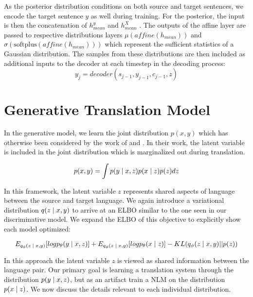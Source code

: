 As the  posterior distribution conditions on both source and target sentences, we encode the target sentence $y$ as well during training. For the posterior, the input is then the concatenation of $h_{mean}^y$ and $h_{mean}^X$ . The outputs of the affine layer are passed to respective distributions layers $\mu(affine(h_{mean}))$ and $\sigma(\text{softplus} (affine(h_{mean})))$ which represent the sufficient statistics of a Gaussian distribution. The samples from these distributions are then included as additional inputs to the decoder at each timestep in the decoding process:
\begin{equation}
y_{j} = decoder(s_{j-1}, y_{j-1}, c_{j-1}, z)
\end{equation}



\section{Generative Translation Model}

In the generative model, we learn the joint distribution $p(x, y)$ which has otherwise been considered by the work of \citet{eikema2018AEVNMT} and \citet{harshil2018GNMT}. In their work, the latent variable is included in the joint distribution which is marginalized out during translation.

\begin{equation}
	p(x, y) = \int p(y \; | \;{x, z})  p(x\; | \;{z}) p(z) dz
\end{equation}

In this framework, the latent variable $z$ represents shared aspects of language between the source and target language. We again introduce a variational distribution $q( z\; | \;{x, y})$ to arrive at an ELBO similar to the one seen in our discriminative model. We expand the \ac{ELBO} of this objective to explicitly show each model optimized:

\begin{equation}
E_{q_{\phi}(z \; | \;{x,y})} [ log p_{\theta}(y \; | \;{x, z})] +
E_{q_{\phi}(z \; | \;{x,y})} [ log p_{\theta}(x \; | \;{z})] -
	KL(q_{\phi}(z \; | \;{x,y}) || p(z))
\end{equation}

In this approach the latent variable $z$ is viewed as shared information between the language pair. Our primary goal is learning a translation system through the distribution $p(y \; | \;{x, z})$, but  as an artifact train a \ac{NLM} on the distribution $p(x \; | \;{z})$. We now discuss the details relevant to each individual distribution. 

